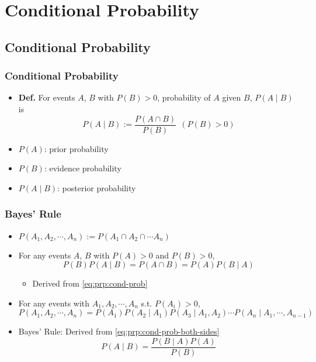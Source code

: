 \section{Conditional Probability}

\subsection{Conditional Probability}

\subsubsection*{Conditional Probability}
\begin{itemize}
    \item \textbf{Def.} For events $A$, $B$ with $P(B)>0$, probability of $A$ given $B$, $P(A\mid B)$ is
    \begin{equation}\label{eq:prp:cond-prob}
        P(A\mid B):=\frac{P(A\cap B)}{P(B)}~~(P(B)>0)
    \end{equation}
    \item $P(A)$: prior probability
    \item $P(B)$: evidence probability
    \item $P(A\mid B)$: posterior probability
\end{itemize}

\subsubsection*{Bayes' Rule}
\begin{itemize}
    \item $P(A_1,A_2,\cdots,A_n):=P(A_1\cap A_2\cap\cdots A_n)$
    \item For any events $A$, $B$ with $P(A)>0$ and $P(B)>0$,
    \begin{equation}\label{eq:prp:cond-prob-both-sides}
        P(B)P(A\mid B)=P(A\cap B)=P(A)P(B\mid A)
    \end{equation}
    \begin{itemize}
        \item Derived from \ref{eq:prp:cond-prob}
    \end{itemize}
    \item For any events with $A_1,A_2,\cdots,A_n$ s.t. $P(A_i)>0$,
    \begin{equation}
        P(A_1,A_2,\cdots,A_n)=P(A_1)P(A_2\mid A_1)P(A_3\mid A_1,A_2)\cdots P(A_n\mid A_1,\cdots,A_{n-1})
    \end{equation}
    \item Bayes' Rule: Derived from \ref{eq:prp:cond-prob-both-sides}
    \begin{equation}\label{eq:prp:bayes-rule}
        P(A\mid B)=\frac{P(B\mid A)P(A)}{P(B)}
    \end{equation}
\end{itemize}

